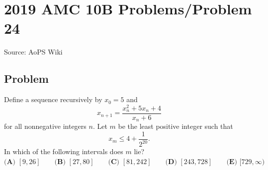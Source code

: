 \documentclass[12pt]{article}
\begin{document}
\section*{{2019 AMC 10B Problems/Problem 24}}
Source: AoPS Wiki

\subsection*{Problem}
Define a sequence recursively by $x_0=5$ and \[x_{n+1}=\frac{x_n^2+5x_n+4}{x_n+6}\] for all nonnegative integers $n.$ Let $m$ be the least positive integer such that \[x_m\leq 4+\frac{1}{2^{20}}.\] In which of the following intervals does $m$ lie? $\textbf{(A) } [9,26] \qquad\textbf{(B) } [27,80] \qquad\textbf{(C) } [81,242]\qquad\textbf{(D) } [243,728] \qquad\textbf{(E) } [729,\infty)$
\end{document}
